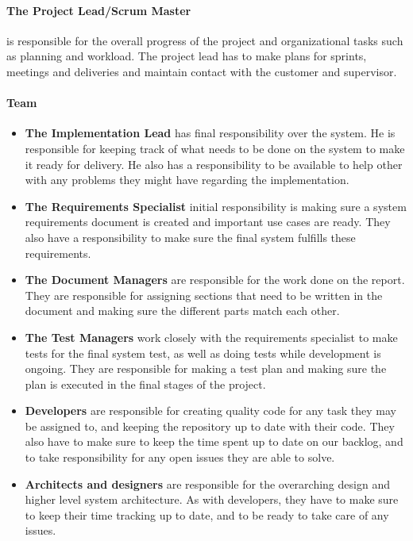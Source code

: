 \paragraph{The Project Lead/Scrum Master} is responsible for the overall progress of the project and organizational tasks such as planning and workload. The project lead has to make plans for sprints, meetings and deliveries and maintain contact with the customer and supervisor.

\paragraph{Team}
\begin{itemize}
    \item \textbf{The Implementation Lead} has  final responsibility over the system. He is responsible for keeping track of what needs to be done on the system to make it ready for delivery. He also has a responsibility to be available to help other with any problems they might have regarding the implementation.
    \item \textbf{The Requirements Specialist} initial responsibility is making sure a system requirements document is created and important use cases are ready. They also have a responsibility to make sure the final system fulfills these requirements.
    \item \textbf{The Document Managers} are responsible for the work done on the report. They are responsible for assigning sections that need to be written in the document and making sure the different parts match each other.
    \item \textbf{The Test Managers} work closely with the requirements specialist to make tests for the final system test, as well as doing tests while development is ongoing. They are responsible for making a test plan and making sure the plan is executed in the final stages of the project.
    \item \textbf{Developers} are responsible for creating quality code for any task they may be assigned to, and keeping the repository up to date with their code. They also have to make sure to keep the time spent up to date on our backlog, and to take responsibility for any open issues they are able to solve.
    \item \textbf{Architects and designers} are responsible for the overarching design and higher level system architecture. As with developers, they have to make sure to keep their time tracking up to date, and to be ready to take care of any issues.
\end{itemize}

